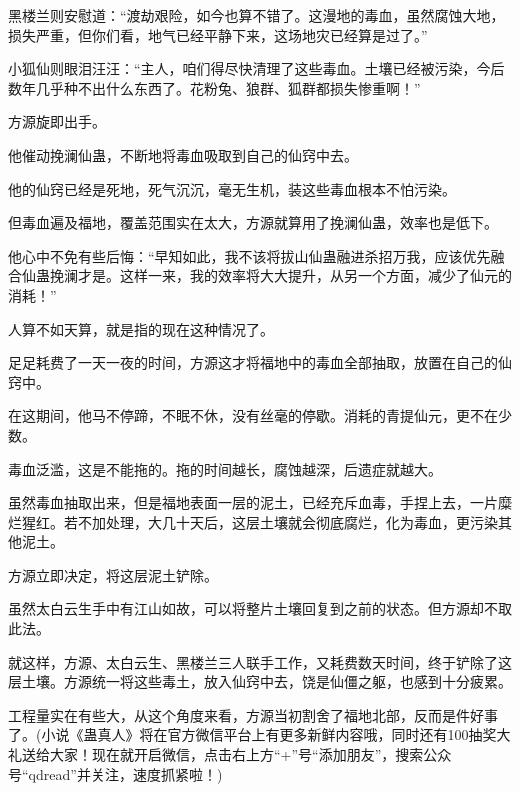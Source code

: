 \begin{this_body}
黑楼兰则安慰道：“渡劫艰险，如今也算不错了。这漫地的毒血，虽然腐蚀大地，损失严重，但你们看，地气已经平静下来，这场地灾已经算是过了。”

小狐仙则眼泪汪汪：“主人，咱们得尽快清理了这些毒血。土壤已经被污染，今后数年几乎种不出什么东西了。花粉兔、狼群、狐群都损失惨重啊！”

方源旋即出手。

他催动挽澜仙蛊，不断地将毒血吸取到自己的仙窍中去。

他的仙窍已经是死地，死气沉沉，毫无生机，装这些毒血根本不怕污染。

但毒血遍及福地，覆盖范围实在太大，方源就算用了挽澜仙蛊，效率也是低下。

他心中不免有些后悔：“早知如此，我不该将拔山仙蛊融进杀招万我，应该优先融合仙蛊挽澜才是。这样一来，我的效率将大大提升，从另一个方面，减少了仙元的消耗！”

人算不如天算，就是指的现在这种情况了。

足足耗费了一天一夜的时间，方源这才将福地中的毒血全部抽取，放置在自己的仙窍中。

在这期间，他马不停蹄，不眠不休，没有丝毫的停歇。消耗的青提仙元，更不在少数。

毒血泛滥，这是不能拖的。拖的时间越长，腐蚀越深，后遗症就越大。

虽然毒血抽取出来，但是福地表面一层的泥土，已经充斥血毒，手捏上去，一片糜烂猩红。若不加处理，大几十天后，这层土壤就会彻底腐烂，化为毒血，更污染其他泥土。

方源立即决定，将这层泥土铲除。

虽然太白云生手中有江山如故，可以将整片土壤回复到之前的状态。但方源却不取此法。

就这样，方源、太白云生、黑楼兰三人联手工作，又耗费数天时间，终于铲除了这层土壤。方源统一将这些毒土，放入仙窍中去，饶是仙僵之躯，也感到十分疲累。

工程量实在有些大，从这个角度来看，方源当初割舍了福地北部，反而是件好事了。(小说《蛊真人》将在官方微信平台上有更多新鲜内容哦，同时还有100抽奖大礼送给大家！现在就开启微信，点击右上方“+”号“添加朋友”，搜索公众号“qdread”并关注，速度抓紧啦！)

\end{this_body}

